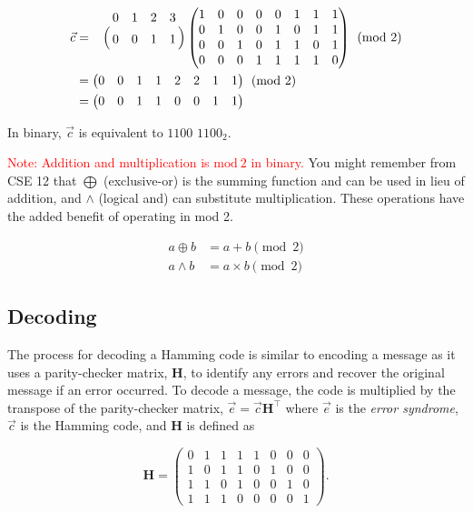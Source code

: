 \documentclass[11pt]{article}
\begin{document}
\begin{align*}
    \Vec{c} &=
      \bordermatrix{~ & 0 & 1 & 2 & 3 \cr
        ~ & 0 & 0 & 1 & 1 \cr}
    \begin{pmatrix}
    1 & 0 & 0 & 0 & 0 & 1 & 1 & 1 \\
    0 & 1 & 0 & 0 & 1 & 0 & 1 & 1 \\
    0 & 0 & 1 & 0 & 1 & 1 & 0 & 1 \\
    0 & 0 & 0 & 1 & 1 & 1 & 1 & 0
  \end{pmatrix} \pmod{2} \\
   &= \begin{pmatrix}0 & 0 & 1 & 1 & 2 & 2 & 1 & 1\end{pmatrix} \pmod{2} \\
   &=\begin{pmatrix}0 & 0 & 1 & 1 & 0 & 0 & 1 & 1\end{pmatrix}
\end{align*}

\noindent In binary, $\Vec{c}$ is equivalent to $1100$ $1100_2$.

\textcolor{red}{Note: Addition and multiplication is $\mathrm{mod}\ 2$ in
binary.} You might remember from CSE 12 that $\bigoplus$ (exclusive-or)
is the summing function and can be used in lieu of addition, and
$\wedge$ (logical and) can substitute multiplication. These operations
have the added benefit of operating in mod 2.

\begin{equation*}
    \begin{split}
        a \oplus b &= a + b \pmod{2} \\
        a \wedge b &= a \times b \pmod{2}
    \end{split}
\end{equation*}

\subsection{Decoding}

The process for decoding a Hamming code is similar to encoding a message
as it uses a parity-checker matrix, $\boldsymbol{H}$, to identify any
errors and recover the original message if an error occurred.  To decode
a message, the code is multiplied by the transpose of the parity-checker
matrix, $\Vec{e} = \Vec{c}\boldsymbol{H^\intercal}$ where $\Vec{e}$ is
the \emph{error syndrome}, $\Vec{c}$ is the Hamming code, and
$\boldsymbol{H}$ is defined as

\begin{equation*}
  \boldsymbol{H} =
  \begin{pmatrix}
    0 & 1 & 1 & 1 & 1 & 0 & 0 & 0 \\
    1 & 0 & 1 & 1 & 0 & 1 & 0 & 0 \\
    1 & 1 & 0 & 1 & 0 & 0 & 1 & 0 \\
    1 & 1 & 1 & 0 & 0 & 0 & 0 & 1
  \end{pmatrix}.
\end{equation*}
\end{document}
